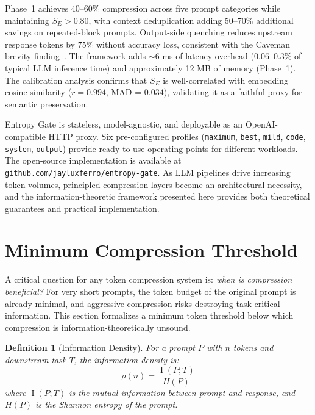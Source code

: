 \documentclass[11pt]{article}
\newtheorem{definition}[theorem]{Definition}
\theoremstyle{remark}
\DeclareMathOperator{\MI}{I}
\begin{document}
Phase~1 achieves 40--60\% compression across five prompt categories while
maintaining $S_E > 0.80$, with context deduplication adding 50--70\%
additional savings on repeated-block prompts. Output-side quenching
reduces upstream response tokens by 75\% without accuracy loss, consistent
with the Caveman brevity finding~\cite{caveman2026}. The framework adds
$\sim$6 ms of latency overhead (0.06--0.3\% of typical LLM inference
time) and approximately 12 MB of memory (Phase~1). The calibration
analysis confirms that $S_E$ is well-correlated with embedding cosine
similarity ($r = 0.994$, MAD = $0.034$), validating it as a faithful
proxy for semantic preservation.

Entropy Gate is stateless, model-agnostic, and deployable as an
OpenAI-compatible HTTP proxy. Six pre-configured profiles
(\texttt{maximum}, \texttt{best}, \texttt{mild}, \texttt{code},
\texttt{system}, \texttt{output}) provide ready-to-use operating points
for different workloads. The open-source implementation is available at
\texttt{github.com/jayluxferro/entropy-gate}. As LLM pipelines drive
increasing token volumes, principled compression layers become an
architectural necessity, and the information-theoretic framework
presented here provides both theoretical guarantees and practical
implementation.

\section{Minimum Compression Threshold}
\label{sec:min-threshold}

A critical question for any token compression system is: \emph{when is
compression beneficial?} For very short prompts, the token budget of the
original prompt is already minimal, and aggressive compression risks
destroying task-critical information. This section formalizes a minimum
token threshold below which compression is information-theoretically
unsound.

\begin{definition}[Information Density]
\label{def:info-density}
For a prompt $P$ with $n$ tokens and downstream task $T$, the information
density is:
\begin{equation}
    \rho(n) = \frac{\MI(P; T)}{H(P)}
\end{equation}
where $\MI(P; T)$ is the mutual information between prompt and response,
and $H(P)$ is the Shannon entropy of the prompt.
\end{definition}
\end{document}
